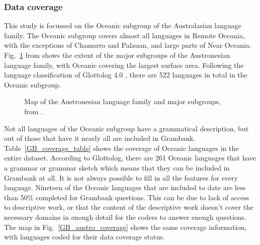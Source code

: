 \documentclass[a4paper,10pt]{article} %
\begin{document}
\subsubsection{Data coverage} 
This study is focussed on the Oceanic subgroup of the Australasian language family. The Oceanic subgroup covers almost all languages in Remote Oceania, with the exceptions of Chamorro and Palauan, and large parts of Near Oceania. Fig.~\ref{Oceanic_map} from \citet[2]{protooceanicvol5} shows the extent of the major subgroups of the Austronesian language family, with Oceanic covering the largest surface area. Following the language classification of Glottolog 4.0 \citep{glottolog40}, there are 522 languages in total in the Oceanic subgroup.

\begin{figure}[h]
\centering
\caption{{Map of the Austronesian language family and major subgroups, from \citet[2]{protooceanicvol5}.}}
\label{Oceanic_map}
\end{figure} 

Not all languages of the Oceanic subgroup have a grammatical description, but out of those that have it nearly all are included in Grambank. Table~\ref{GB_coverage_table} shows the coverage of Oceanic languages in the entire dataset. According to Glottolog, there are 261 Oceanic languages that have a grammar or grammar sketch which means that they can be included in Grambank at all. It is not always possible to fill in all the features for every language. Nineteen of the Oceanic languages that are included to date are less than 50\% completed for Grambank questions. This can be due to lack of access to descriptive work, or that the content of the descriptive work doesn't cover the necessary domains in enough detail for the coders to answer enough questions. The map in Fig.~\ref{GB_austro_coverage} shows the same coverage information, with languages coded for their data coverage status.
\end{document}
